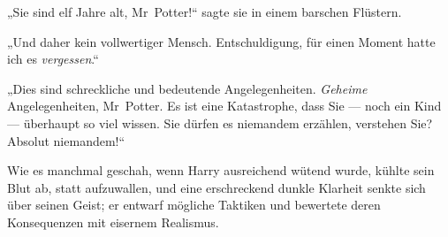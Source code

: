 „Sie sind elf Jahre alt, Mr~Potter!“ sagte sie in einem barschen Flüstern.

„Und daher kein vollwertiger Mensch. Entschuldigung, für einen Moment hatte ich es \emph{vergessen}.“

„Dies sind schreckliche und bedeutende Angelegenheiten. \emph{Geheime} Angelegenheiten, Mr~Potter. Es ist eine Katastrophe, dass Sie — noch ein Kind — überhaupt so viel wissen. Sie dürfen es niemandem erzählen, verstehen Sie? Absolut niemandem!“

Wie es manchmal geschah, wenn Harry ausreichend wütend wurde, kühlte sein Blut ab, statt aufzuwallen, und eine erschreckend dunkle Klarheit senkte sich über seinen Geist; er entwarf mögliche Taktiken und bewertete deren Konsequenzen mit eisernem Realismus.

